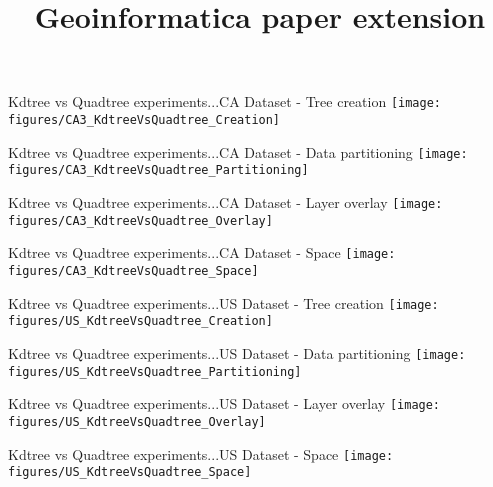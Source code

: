 \documentclass{beamer}
\makeatletter
\newcommand\makebeamertitle{\frame{\maketitle}}%
\let\origtableofcontents=\tableofcontents
\def\tableofcontents{\@ifnextchar[{\origtableofcontents}{\gobbletableofcontents}}
\def\gobbletableofcontents#1{\origtableofcontents}
\makeatother
\begin{document}
\title[SDCEL report]{Geoinformatica paper extension}
\author[AC]{}
\makebeamertitle
\newif\iflattersubsect


\AtBeginSubsection[] {
  \begin{frame}<beamer>
    \frametitle{Outline} 
    \tableofcontents[currentsubsection]  
  \end{frame}
}


\begin{frame}{Kdtree vs Quadtree experiments...}{CA Dataset - Tree creation}
  \centering 
  \texttt{[image: figures/CA3\_KdtreeVsQuadtree\_Creation]}
\end{frame}
\begin{frame}{Kdtree vs Quadtree experiments...}{CA Dataset - Data partitioning}
  \centering
  \texttt{[image: figures/CA3\_KdtreeVsQuadtree\_Partitioning]}
\end{frame}
\begin{frame}{Kdtree vs Quadtree experiments...}{CA Dataset - Layer overlay}
  \centering
  \texttt{[image: figures/CA3\_KdtreeVsQuadtree\_Overlay]}
\end{frame}
\begin{frame}{Kdtree vs Quadtree experiments...}{CA Dataset - Space}
  \centering
  \texttt{[image: figures/CA3\_KdtreeVsQuadtree\_Space]}
\end{frame}

\begin{frame}{Kdtree vs Quadtree experiments...}{US Dataset - Tree creation}
  \centering
  \texttt{[image: figures/US\_KdtreeVsQuadtree\_Creation]}
\end{frame}
\begin{frame}{Kdtree vs Quadtree experiments...}{US Dataset - Data partitioning}
  \centering
  \texttt{[image: figures/US\_KdtreeVsQuadtree\_Partitioning]}
\end{frame}
\begin{frame}{Kdtree vs Quadtree experiments...}{US Dataset - Layer overlay}
  \centering
  \texttt{[image: figures/US\_KdtreeVsQuadtree\_Overlay]}
\end{frame}
\begin{frame}{Kdtree vs Quadtree experiments...}{US Dataset - Space}
  \centering
  \texttt{[image: figures/US\_KdtreeVsQuadtree\_Space]}
\end{frame}
\end{document}
